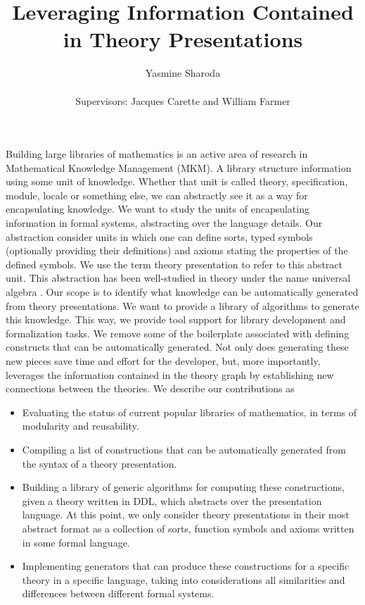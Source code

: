 \documentclass[orivec]{llncs}
\begin{document}
\title{Leveraging Information Contained \\ in Theory Presentations}
\author{Yasmine Sharoda \\  \\[0.3cm] Supervisors: Jacques 
Carette and William Farmer}
\maketitle

Building large libraries of mathematics is an active area of research in Mathematical Knowledge 
Management (MKM). A library structure information using some unit of knowledge. Whether that unit is 
called theory, specification, module, locale or something else, we can abstractly see it as a way for 
encapsulating knowledge. 
We want to study the units of encapsulating information in formal systems, abstracting over the 
language details. Our abstraction consider units in which one can define sorts, typed symbols 
(optionally providing their definitions) and axioms stating the properties of the defined symbols. We 
use the term theory presentation to refer to this abstract unit. This abstraction has been well-studied 
in theory under the name universal algebra \cite{wechler1992universal}. Our scope is to identify what 
knowledge can be automatically generated from theory presentations. We want to provide a library of 
algorithms to generate this knowledge. This way, we provide tool support for library development and 
formalization tasks. We remove some of the boilerplate associated with defining constructs that can 
be automatically generated. Not only does generating these new pieces save time and effort for the 
developer, but, more importantly, leverages the information contained in the theory graph by 
establishing new connections between the theories. We describe our contributions as 
\begin{itemize}
	\item Evaluating the status of current popular libraries of mathematics, in terms of modularity and 
	reusability.
	\item Compiling a list of constructions that can be automatically generated from the syntax of a 
	theory presentation. 
	\item Building a library of generic algorithms for computing these constructions, given a theory 
	written in DDL, which abstracts over the presentation language. At this point, we only consider 
	theory presentations in their most abstract format as a collection of sorts, function symbols and 
	axioms written in some formal language.  
	\item Implementing generators that can produce these constructions for a specific theory in a 
	specific language, taking into considerations all similarities and differences between different formal 
	systems.   
\end{itemize}
\end{document}
